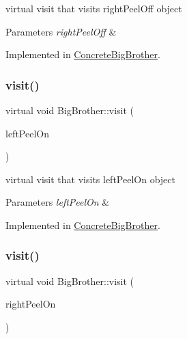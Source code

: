 virtual visit that visits right\+Peel\+Off object 
\begin{DoxyParams}{Parameters}
{\em right\+Peel\+Off} & \\
\hline
\end{DoxyParams}


Implemented in \mbox{\hyperlink{class_concrete_big_brother_a972dde2c8065422c01a323b010f4ffdf}{Concrete\+Big\+Brother}}.

\mbox{\label{class_big_brother_a22ee539312b1b56ef51e3a22a05f70d5}} 
\subsubsection{\texorpdfstring{visit()}{visit()}\hspace{0.1cm}{\footnotesize\ttfamily [5/7]}}
{\footnotesize\ttfamily virtual void Big\+Brother\+::visit (\begin{DoxyParamCaption}\item[{\mbox{\hyperlink{class_left_peel_on}{Left\+Peel\+On}} $\ast$}]{left\+Peel\+On }\end{DoxyParamCaption})\hspace{0.3cm}{\ttfamily [pure virtual]}}

virtual visit that visits left\+Peel\+On object 
\begin{DoxyParams}{Parameters}
{\em left\+Peel\+On} & \\
\hline
\end{DoxyParams}


Implemented in \mbox{\hyperlink{class_concrete_big_brother_ad936670c1591d213dda894fd72e87421}{Concrete\+Big\+Brother}}.

\mbox{\label{class_big_brother_a4fbe48dafe53fe16647e0c4627ef178c}} 
\subsubsection{\texorpdfstring{visit()}{visit()}\hspace{0.1cm}{\footnotesize\ttfamily [6/7]}}
{\footnotesize\ttfamily virtual void Big\+Brother\+::visit (\begin{DoxyParamCaption}\item[{\mbox{\hyperlink{class_right_peel_on}{Right\+Peel\+On}} $\ast$}]{right\+Peel\+On }\end{DoxyParamCaption})\hspace{0.3cm}{\ttfamily [pure virtual]}}

